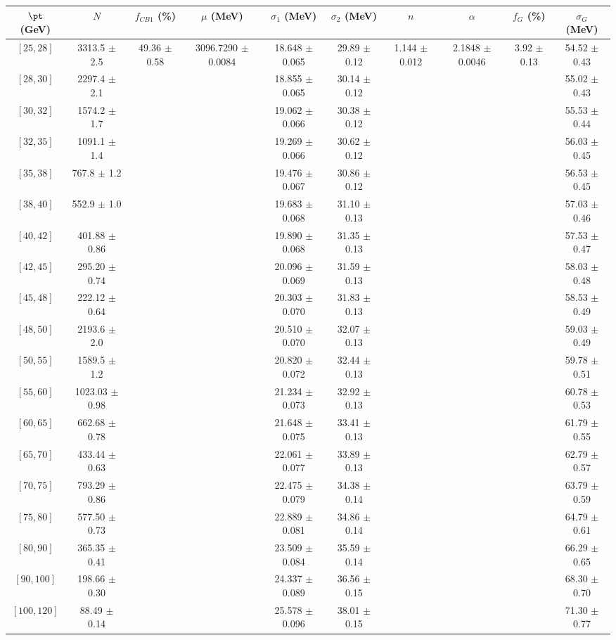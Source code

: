 \begin{tabular}{c||c|c|c|c|c|c|c|c|c}
$\pt$ (GeV) & $N$ & $f_{CB1}$ (\%)  & $\mu$ (MeV) & $\sigma_1$ (MeV) & $\sigma_2$ (MeV) & $n$ & $\alpha$ & $f_G$ (\%) & $\sigma_G$ (MeV) \\
\hline
$[25, 28]$ & 3313.5 $\pm$ 2.5 & \multirow{19}{*}{49.36 $\pm$ 0.58} & \multirow{19}{*}{3096.7290 $\pm$ 0.0084} & 18.648 $\pm$ 0.065 & 29.89 $\pm$ 0.12 & \multirow{19}{*}{1.144 $\pm$ 0.012} & \multirow{19}{*}{2.1848 $\pm$ 0.0046} & \multirow{19}{*}{3.92 $\pm$ 0.13} & 54.52 $\pm$ 0.43\\
$[28, 30]$ & 2297.4 $\pm$ 2.1 &  &  & 18.855 $\pm$ 0.065 & 30.14 $\pm$ 0.12 &  &  &  & 55.02 $\pm$ 0.43\\
$[30, 32]$ & 1574.2 $\pm$ 1.7 &  &  & 19.062 $\pm$ 0.066 & 30.38 $\pm$ 0.12 &  &  &  & 55.53 $\pm$ 0.44\\
$[32, 35]$ & 1091.1 $\pm$ 1.4 &  &  & 19.269 $\pm$ 0.066 & 30.62 $\pm$ 0.12 &  &  &  & 56.03 $\pm$ 0.45\\
$[35, 38]$ & 767.8 $\pm$ 1.2 &  &  & 19.476 $\pm$ 0.067 & 30.86 $\pm$ 0.12 &  &  &  & 56.53 $\pm$ 0.45\\
$[38, 40]$ & 552.9 $\pm$ 1.0 &  &  & 19.683 $\pm$ 0.068 & 31.10 $\pm$ 0.13 &  &  &  & 57.03 $\pm$ 0.46\\
$[40, 42]$ & 401.88 $\pm$ 0.86 &  &  & 19.890 $\pm$ 0.068 & 31.35 $\pm$ 0.13 &  &  &  & 57.53 $\pm$ 0.47\\
$[42, 45]$ & 295.20 $\pm$ 0.74 &  &  & 20.096 $\pm$ 0.069 & 31.59 $\pm$ 0.13 &  &  &  & 58.03 $\pm$ 0.48\\
$[45, 48]$ & 222.12 $\pm$ 0.64 &  &  & 20.303 $\pm$ 0.070 & 31.83 $\pm$ 0.13 &  &  &  & 58.53 $\pm$ 0.49\\
$[48, 50]$ & 2193.6 $\pm$ 2.0 &  &  & 20.510 $\pm$ 0.070 & 32.07 $\pm$ 0.13 &  &  &  & 59.03 $\pm$ 0.49\\
$[50, 55]$ & 1589.5 $\pm$ 1.2 &  &  & 20.820 $\pm$ 0.072 & 32.44 $\pm$ 0.13 &  &  &  & 59.78 $\pm$ 0.51\\
$[55, 60]$ & 1023.03 $\pm$ 0.98 &  &  & 21.234 $\pm$ 0.073 & 32.92 $\pm$ 0.13 &  &  &  & 60.78 $\pm$ 0.53\\
$[60, 65]$ & 662.68 $\pm$ 0.78 &  &  & 21.648 $\pm$ 0.075 & 33.41 $\pm$ 0.13 &  &  &  & 61.79 $\pm$ 0.55\\
$[65, 70]$ & 433.44 $\pm$ 0.63 &  &  & 22.061 $\pm$ 0.077 & 33.89 $\pm$ 0.13 &  &  &  & 62.79 $\pm$ 0.57\\
$[70, 75]$ & 793.29 $\pm$ 0.86 &  &  & 22.475 $\pm$ 0.079 & 34.38 $\pm$ 0.14 &  &  &  & 63.79 $\pm$ 0.59\\
$[75, 80]$ & 577.50 $\pm$ 0.73 &  &  & 22.889 $\pm$ 0.081 & 34.86 $\pm$ 0.14 &  &  &  & 64.79 $\pm$ 0.61\\
$[80, 90]$ & 365.35 $\pm$ 0.41 &  &  & 23.509 $\pm$ 0.084 & 35.59 $\pm$ 0.14 &  &  &  & 66.29 $\pm$ 0.65\\
$[90, 100]$ & 198.66 $\pm$ 0.30 &  &  & 24.337 $\pm$ 0.089 & 36.56 $\pm$ 0.15 &  &  &  & 68.30 $\pm$ 0.70\\
$[100, 120]$ & 88.49 $\pm$ 0.14 &  &  & 25.578 $\pm$ 0.096 & 38.01 $\pm$ 0.15 &  &  &  & 71.30 $\pm$ 0.77\\
\end{tabular}
